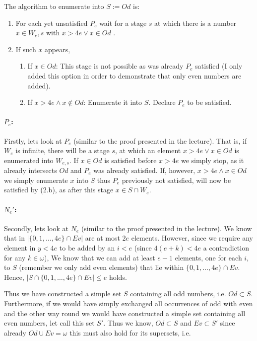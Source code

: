 \documentclass[11pt,a4paper]{article}
\begin{document}
The algorithm to enumerate into $S:=Od$ is:
\begin{enumerate}
\item For each yet unsatisfied $P_e$ wait for a stage $s$ at which there is a number $x \in W_e,s$ with $x > 4e \vee x \in Od$ .
\item If such $x$ appears, 
\begin{enumerate}
\item  If $x \in Od$:  This stage is not possible as was already $P_e$ satisfied (I only added this option in order to demonstrate that only even numbers are added).
\item  If $x > 4e \wedge x \nin Od$:  Enumerate it into $S$. Declare $P_e$ to be satisfied.
\end{enumerate}
\end{enumerate}

\paragraph*{$P_e$:} 
Firstly, lets look at $P_e$ (similar to the proof presented in the lecture).
That is, if $W_e$ is infinite, there will be a stage $s$, at which an element $x > 4e \vee x \in Od$ is enumerated into $W_{e,s}$. 
If $x \in Od$ is satisfied before $x > 4e$ we simply stop, as it already intersects $Od$ and $P_e$ was already satisfied.
If, however, $x > 4e \wedge x \in Od$ we simply enumerate $x$ into $S$ thus $P_e$ previously not satisfied, will now be satisfied by (2.b), as after this stage $x \in S \cap W_e$.

\paragraph*{$N_e'$:} 
Secondly, lets look at $N_e$ (similar to the proof presented in the lecture). 
We know that in $|\{0, 1, \ldots , 4e\} \cap Ev|$ are at most $2e$ elements. 
However, since we require any element in $y<4e$ to be added by an $i<e$ (since $4(e+k)<4e$ a contradiction for any $k\in \omega$),
We know that we can add at least $e-1$ elements, one for each $i$, to $S$ (remember we only add even elements) that lie within
$\{0, 1, \ldots , 4e\} \cap Ev$. Hence, $|S \cap \{0, 1, \ldots , 4e\} \cap Ev| \leq e$ holds. \\
\linebreak

Thus we have constructed a simple set $S$ containing all odd numbers, i.e. $Od \subset S$.
Furthermore, if we would have simply exchanged all occurrences of odd with even and the other way round we would have 
constructed a simple set containing all even numbers, let call this set $S'$.
Thus we know, $Od \subset S$ and $Ev \subset S'$ since already $Od \cup Ev = \omega$ this must also hold for its supersets, i.e.
\end{document}
